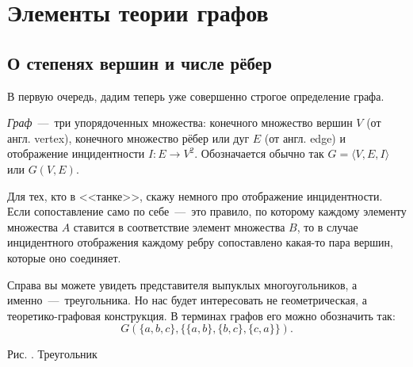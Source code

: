 \chapter{Элементы теории графов}
\section{О степенях вершин и числе рёбер}
	
	
	В первую очередь, дадим теперь уже совершенно строгое определение графа.

\begin{definition}
	\emph{Граф}~---~три упорядоченных множества: конечного множество вершин $V$ (от англ. vertex), конечного множество рёбер или дуг $E$ (от англ. edge) и отображение инцидентности $I: E \to V^2$. Обозначается обычно так $G = \langle V, E, I\rangle$ или $G(V, E)$.
\end{definition}

	Для тех, кто в <<танке>>, скажу немного про отображение инцидентности. Если сопоставление само по себе~---~это правило, по которому каждому элементу множества $A$ ставится в соответствие элемент множества $B$, то в случае инцидентного отображения каждому ребру сопоставлено какая-то пара вершин, которые оно соединяет.

\begin{paracol}{2}
\begin{example}
	Справа вы можете увидеть представителя выпуклых многоугольников, а именно~---~треугольника. Но нас будет интересовать не геометрическая, а теоретико-графовая конструкция. В терминах графов его можно обозначить так:
	$$G(\lbrace a, b, c\rbrace, \lbrace \lbrace a, b\rbrace, \lbrace b, c\rbrace, \lbrace c, a\rbrace \rbrace).$$
\end{example}

\switchcolumn

\begin{center}

	\small Рис. \images. Треугольник
\end{center}
\end{paracol}

